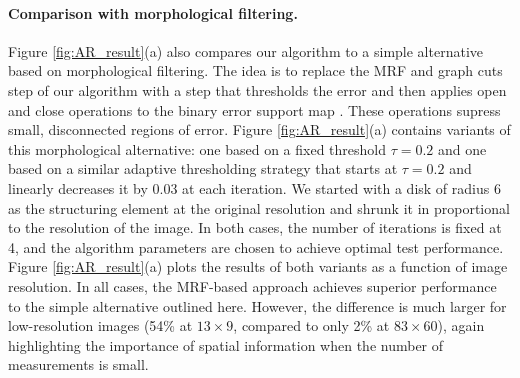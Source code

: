 \paragraph{Comparison with morphological filtering.}
Figure \ref{fig:AR_result}(a) also compares our algorithm to a simple alternative based on morphological filtering. The idea is to replace the MRF and graph cuts step of our algorithm with a step that thresholds the error and then applies open and close operations to the binary error support map \cite{morph}. These operations supress small, disconnected regions of error. Figure \ref{fig:AR_result}(a) contains variants of this morphological alternative: one based on a fixed threshold $\tau = 0.2$ and one based on a similar adaptive thresholding strategy that starts at $\tau = 0.2$ and linearly decreases it by $0.03$ at each iteration. We started with a disk of radius 6 as the structuring element at the original resolution and shrunk it in proportional to the resolution of the image. In both cases, the number of iterations is fixed at 4, and the algorithm parameters are chosen to achieve optimal test performance. Figure \ref{fig:AR_result}(a) plots the results of both variants as a function of image resolution. In all cases, the MRF-based approach achieves superior performance to the simple alternative outlined here. However, the difference is much larger for low-resolution images (54\% at $13\times 9$, compared to only 2\% at $83 \times 60$), again highlighting the importance of spatial information when the number of measurements is small.\vspace{0mm}
